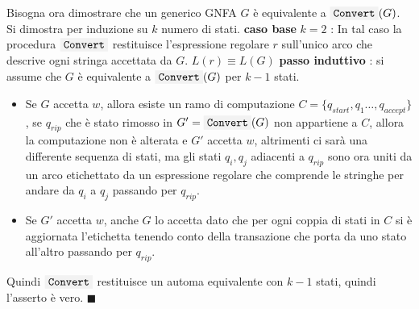 \documentclass[10pt, letterpaper]{report}
\begin{document}
Bisogna ora dimostrare che un generico GNFA $G$ è equivalente a $\text{\code{Convert}}(G)$. Si dimostra per induzione su 
$k$ numero di stati.\acc 
  \textbf{caso base} $k=2$ : In tal caso la procedura $\text{\code{Convert}}$ restituisce l'espressione regolare 
    $r$ sull'unico arco che descrive ogni stringa accettata da $G$. $L(r)\equiv L(G)$ \acc 
    \textbf{passo induttivo} : si assume che $G$ è equivalente a $\text{\code{Convert}}(G)$ per $k-1$ stati.\begin{itemize}
        \item Se $G$ accetta $w$, allora esiste un ramo di computazione $C=\{q_{start},q_1\dots, q_{accept}\}$, se 
        $q_{rip}$ che è stato rimosso in $G'=\text{\code{Convert}}(G)$ non appartiene a $C$, allora la computazione non è 
        alterata e $G'$ accetta $w$, altrimenti ci sarà una differente sequenza di stati, ma gli stati $q_i,q_j$ adiacenti 
        a $q_{rip}$ sono ora uniti da un arco etichettato da un espressione regolare che comprende le stringhe per 
        andare da $q_i$ a $q_j$ passando per $q_{rip}$.
        \item Se $G'$ accetta $w$, anche $G$ lo accetta dato che per ogni coppia di stati in $C$ si è aggiornata 
        l'etichetta tenendo conto della transazione che porta da uno stato all'altro passando per $q_{rip}$.
    \end{itemize}
Quindi $\text{\code{Convert}}$ restituisce un automa equivalente con $k-1$ stati, quindi l'asserto è vero. $\blacksquare$\newpage
\end{document}
